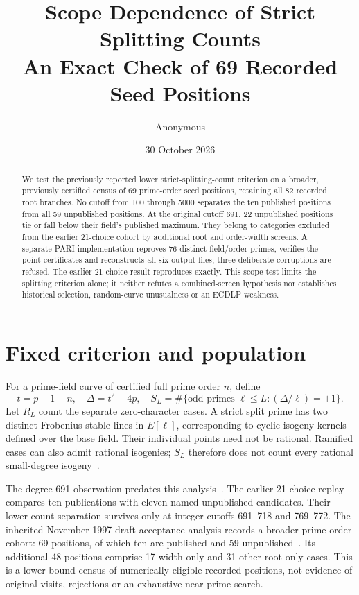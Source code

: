 \documentclass[10pt]{article}
\title{Scope Dependence of Strict Splitting Counts\\
\large An Exact Check of 69 Recorded Seed Positions}
\author{Anonymous}
\date{30 October 2026}
\makeatletter
\renewcommand{\maketitle}{\begin{center}{\Large\bfseries\@title\par}\vspace{5pt}\@author\qquad\@date\end{center}}
\makeatother
\begin{document}
\maketitle
\begin{abstract}
We test the previously reported lower strict-splitting-count criterion on a
broader, previously certified census of 69 prime-order seed positions, retaining
all 82 recorded root branches. No cutoff from 100 through 5000 separates the
ten published positions from all 59 unpublished positions. At the original
cutoff 691, 22 unpublished positions tie or fall below their field's published
maximum. They belong to categories excluded from the earlier 21-choice cohort
by additional root and order-width screens. A separate PARI implementation
reproves 76 distinct field/order primes, verifies the point certificates and
reconstructs all six output files; three deliberate corruptions are refused.
The earlier 21-choice result reproduces exactly. This scope test limits the
splitting criterion alone; it neither refutes a combined-screen hypothesis nor
establishes historical selection, random-curve unusualness or an ECDLP weakness.
\end{abstract}

\section{Fixed criterion and population}
For a prime-field curve of certified full prime order $n$, define
\[
 t=p+1-n,\quad \Delta=t^2-4p,\quad
 S_L=\#\{\text{odd primes }\ell\le L:(\Delta/\ell)=+1\}.
\]
Let $R_L$ count the separate zero-character cases. A strict split prime has
two distinct Frobenius-stable lines in $E[\ell]$, corresponding to cyclic
isogeny kernels defined over the base field. Their individual points need
not be rational. Ramified cases can also admit rational isogenies; $S_L$
therefore does not count every rational small-degree isogeny~\cite{ss,pari}.

The degree-691 observation predates this analysis~\cite{asanso}. The earlier
21-choice replay compares ten publications with eleven named unpublished
candidates. Their lower-count separation survives only at integer cutoffs
691--718 and 769--772. The inherited November-1997-draft acceptance analysis
records a broader prime-order cohort: 69 positions, of which ten are published
and 59 unpublished~\cite{acceptance}. Its additional 48 positions comprise
17 width-only and 31 other-root-only cases. This is a lower-bound census of
numerically eligible recorded positions, not evidence of original visits,
rejections or an exhaustive near-prime search.
\end{document}
